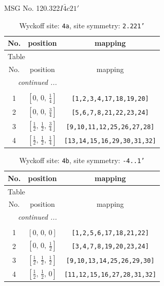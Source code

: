 \documentclass[fleqn,8pt]{jsarticle}
\begin{document}
\setcounter{MaxMatrixCols}{32}

\renewcommand{\tablename}{Table~}
\renewcommand{\figurename}{Figure~}
\begin{center}
\LARGE
MSG No. 120.322\quad$I\bar{4}c21'$
\end{center}
\renewcommand{\arraystretch}{1.2}
\begin{longtable}{ccc}
\caption{Wyckoff site: {\tt 4a}, site symmetry: {\tt 2.221'}}
 \\
 \hline \hline
No. & position & mapping \\ \hline \endfirsthead

\multicolumn{2}{l}{\tablename\ \thetable{}} \\
 \hline \hline
No. & position & mapping \\ \hline \endhead

 \hline \hline
\multicolumn{2}{r}{\footnotesize\it continued ...} \\ \endfoot

 \hline \hline
\multicolumn{2}{r}{} \\ \endlastfoot

1 & $\left[ 0,\, 0,\, \frac{1}{4} \right]$ & {\tt [1,2,3,4,17,18,19,20]} \\ \hline
2 & $\left[ 0,\, 0,\, \frac{3}{4} \right]$ & {\tt [5,6,7,8,21,22,23,24]} \\ \hline
3 & $\left[ \frac{1}{2},\, \frac{1}{2},\, \frac{3}{4} \right]$ & {\tt [9,10,11,12,25,26,27,28]} \\ \hline
4 & $\left[ \frac{1}{2},\, \frac{1}{2},\, \frac{1}{4} \right]$ & {\tt [13,14,15,16,29,30,31,32]} \\
\end{longtable}
\renewcommand{\arraystretch}{1.2}
\begin{longtable}{ccc}
\caption{Wyckoff site: {\tt 4b}, site symmetry: {\tt -4..1'}}
 \\
 \hline \hline
No. & position & mapping \\ \hline \endfirsthead

\multicolumn{2}{l}{\tablename\ \thetable{}} \\
 \hline \hline
No. & position & mapping \\ \hline \endhead

 \hline \hline
\multicolumn{2}{r}{\footnotesize\it continued ...} \\ \endfoot

 \hline \hline
\multicolumn{2}{r}{} \\ \endlastfoot

1 & $\left[ 0,\, 0,\, 0 \right]$ & {\tt [1,2,5,6,17,18,21,22]} \\ \hline
2 & $\left[ 0,\, 0,\, \frac{1}{2} \right]$ & {\tt [3,4,7,8,19,20,23,24]} \\ \hline
3 & $\left[ \frac{1}{2},\, \frac{1}{2},\, \frac{1}{2} \right]$ & {\tt [9,10,13,14,25,26,29,30]} \\ \hline
4 & $\left[ \frac{1}{2},\, \frac{1}{2},\, 0 \right]$ & {\tt [11,12,15,16,27,28,31,32]} \\
\end{longtable}
\end{document}
